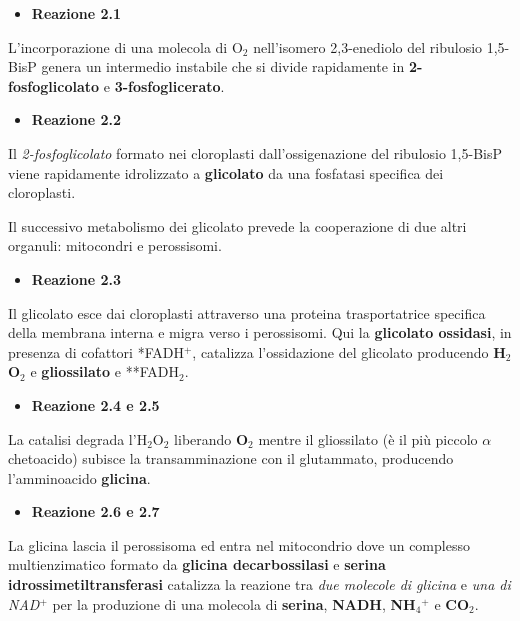 \documentclass[]{article}
\begin{document}
\begin{itemize}
\itemsep1pt\parskip0pt
\item
  \textbf{Reazione 2.1}
\end{itemize}

L'incorporazione di una molecola di O$_2$ nell'isomero 2,3-enediolo del
ribulosio 1,5-BisP genera un intermedio instabile che si divide
rapidamente in \textbf{2-fosfoglicolato} e \textbf{3-fosfoglicerato}.

\begin{itemize}
\itemsep1pt\parskip0pt
\item
  \textbf{Reazione 2.2}
\end{itemize}

Il \emph{2-fosfoglicolato} formato nei cloroplasti dall'ossigenazione
del ribulosio 1,5-BisP viene rapidamente idrolizzato a
\textbf{glicolato} da una fosfatasi specifica dei cloroplasti.

Il successivo metabolismo dei glicolato prevede la cooperazione di due
altri organuli: mitocondri e perossisomi.

\begin{itemize}
\itemsep1pt\parskip0pt
\item
  \textbf{Reazione 2.3}
\end{itemize}

Il glicolato esce dai cloroplasti attraverso una proteina trasportatrice
specifica della membrana interna e migra verso i perossisomi. Qui la
\textbf{glicolato ossidasi}, in presenza di cofattori *FADH$^+$,
catalizza l'ossidazione del glicolato producendo \textbf{H$_2$O$_2$} e
\textbf{gliossilato} e **FADH$_2$.

\begin{itemize}
\itemsep1pt\parskip0pt
\item
  \textbf{Reazione 2.4 e 2.5}
\end{itemize}

La catalisi degrada l'H$_2$O$_2$ liberando \textbf{O$_2$} mentre il
gliossilato (è il più piccolo $\alpha$chetoacido) subisce la
transamminazione con il glutammato, producendo l'amminoacido
\textbf{glicina}.

\begin{itemize}
\itemsep1pt\parskip0pt
\item
  \textbf{Reazione 2.6 e 2.7}
\end{itemize}

La glicina lascia il perossisoma ed entra nel mitocondrio dove un
complesso multienzimatico formato da \textbf{glicina decarbossilasi} e
\textbf{serina idrossimetiltransferasi} catalizza la reazione tra
\emph{due molecole di glicina} e \emph{una di NAD$^+$} per la produzione
di una molecola di \textbf{serina}, \textbf{NADH}, \textbf{NH$_4$$^+$} e
\textbf{CO$_2$}.
\end{document}
